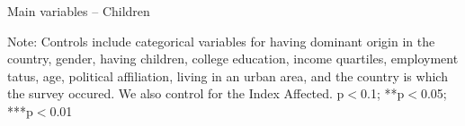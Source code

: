 \documentclass{article}
\begin{document}
\begin{table}[h!]
	\caption{Main variables -- Children}
	\begin{center}
		\scalebox{0.55}{}
	\end{center}
	{\footnotesize Note: Controls include categorical variables for having dominant origin in the country, gender, having children, college education, income quartiles, employment tatus, age, political affiliation, living in an urban area, and the country is which the survey occured. We also control for the Index Affected.
	\newline *p$<$0.1; **p$<$0.05; ***p$<$0.01}
\end{table}	




\end{document}
